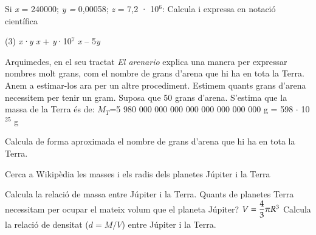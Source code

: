\begin{mylist}
 


\exer  Si  \textit{x} = 240000; \textit{y =} 0,00058; \textit{z }= 7,2 · 10${}^{6}$: Calcula i expressa en notació científica 
\begin{tasks}(3)
 \task \textit{x·y}      \textit{x }+ \textit{y}·10${}^{7}$      \textit{x} -- 5\textit{y}
\end{tasks}


\exer[1]  Arquimedes, en el seu tractat \textit{El arenario} explica una manera per expressar nombres molt grans, com el nombre de grans d'arena que hi ha en tota la Terra. Anem a estimar-los ara per un altre procediment. Estimem quants grans d'arena necessitem per tenir un gram. Suposa que 50 grans d'arena. S'estima que la massa de la Terra és de:  $M_T$=5 980 000 000 000 000 000 000 000 000 g = 598 \textbf{$\boldsymbol{\cdot}$} 10${}^{25}$ g

 Calcula de forma aproximada el nombre de grans d'arena que hi ha en tota la Terra.
 


 

\vspace{-2cm}
\exer  \begin{minipage}[t]{0.7\textwidth}
	\simbolsearch Cerca a Wikipèdia les masses i els radis dels planetes Júpiter i la Terra
	\begin{tasks}
	\task Calcula la relació de massa entre Júpiter i la Terra.
	\task Quants de planetes Terra necessitam per ocupar el mateix volum que el planeta Júpiter? $V=\ofrac{4}{3}\pi R^3$
	\task Calcula la relació de densitat ($d=M/V$) entre Júpiter i la Terra.
	\end{tasks}
	

\end{minipage}
\end{mylist}
